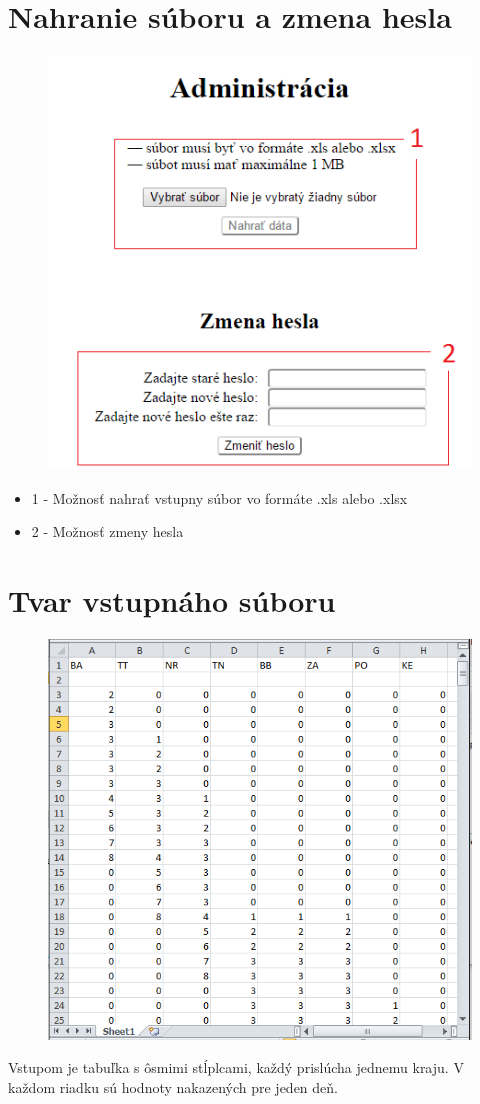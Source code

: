 \documentclass[12pt,a4paper]{report}
\begin{document}
\pagebreak
\section{Nahranie súboru a zmena hesla}
\begin{figure}[htb]
	\includegraphics[scale=0.8]{administracia}
	\label{fig:administracia}
\end{figure}

\begin{itemize}
	\item 1 - Možnosť nahrať vstupny súbor vo formáte .xls alebo .xlsx
	\item 2 - Možnosť zmeny hesla
\end{itemize}
\pagebreak


\section{Tvar vstupnáho súboru}
\begin{figure}[htb]
	\includegraphics[scale=0.8]{vstup}
	\label{fig:vstup}
\end{figure}

\par Vstupom je tabuľka s ôsmimi stĺplcami, každý prislúcha jednemu kraju. V každom riadku sú hodnoty nakazených pre jeden deň. 
\end{document}

